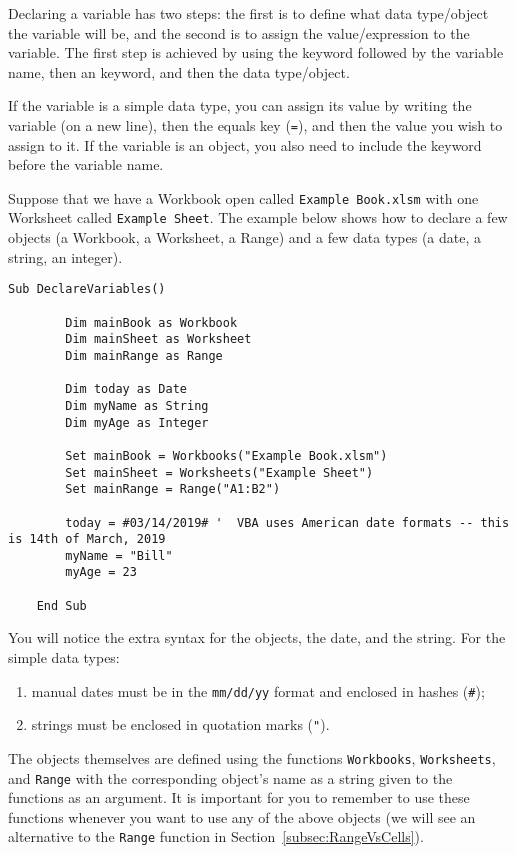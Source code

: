 \documentclass[11pt]{article}%
\begin{document}
Declaring a variable has two steps: the first is to define what data type/object the variable will be, and the second is to assign the value/expression to the variable. The first step is achieved by using the  keyword followed by the variable name, then an  keyword, and then the data type/object.

If the variable is a simple data type, you can assign its value by writing the variable (on a new line), then the equals key (\texttt{=}), and then the value you wish to assign to it. If the variable is an object, you also need to include the  keyword before the variable name.

Suppose that we have a Workbook open called \texttt{Example Book.xlsm} with one Worksheet called \texttt{Example Sheet}. The example below shows how to declare a few objects (a Workbook, a Worksheet, a Range) and a few data types (a date, a string, an integer).\\

\begin{lstlisting}[style=A]
    Sub DeclareVariables()

        Dim mainBook as Workbook
        Dim mainSheet as Worksheet
        Dim mainRange as Range

        Dim today as Date
        Dim myName as String
        Dim myAge as Integer

        Set mainBook = Workbooks("Example Book.xlsm")
        Set mainSheet = Worksheets("Example Sheet")
        Set mainRange = Range("A1:B2")

        today = #03/14/2019# '  VBA uses American date formats -- this is 14th of March, 2019
        myName = "Bill"
        myAge = 23

    End Sub
\end{lstlisting}

You will notice the extra syntax for the objects, the date, and the string. For the simple data types:
\begin{enumerate}
    \item manual dates must be in the \texttt{mm/dd/yy} format and enclosed in hashes (\texttt{\#});
    \item strings must be enclosed in quotation marks (\texttt{"}).
\end{enumerate}
The objects themselves are defined using the functions \texttt{Workbooks}, \texttt{Worksheets}, and \texttt{Range} with the corresponding object's name as a string given to the functions as an argument. It is important for you to remember to use these functions whenever you want to use any of the above objects (we will see an alternative to the \texttt{Range} function in Section~\ref{subsec:RangeVsCells}).
\end{document}
